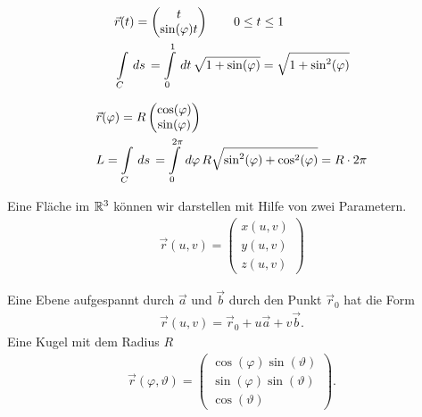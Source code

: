 \begin{Beispiel}
\begin{align*}
&\vec{r}(t) = \begin{pmatrix}t\\ \sin(\varphi) t\end{pmatrix}\qquad 0\le
t\le1\\ &\int \limits_{C} \,ds\, = \int \limits_{0}^{1} \,dt\, \sqrt{1+\sin(\varphi)} =
\sqrt{1+\sin^2(\varphi)}
\end{align*}
\end{Beispiel}
\begin{Beispiel}
\begin{align*}
 &\vec{r}(\varphi) =
R\begin{pmatrix}\cos(\varphi)\\ \sin(\varphi) \end{pmatrix}\\
 &L = \int \limits_{C} \,ds\, = \int \limits_{0}^{2\pi} \,d\varphi\,
 R\sqrt{\sin^2(\varphi) + \cos^2(\varphi)} = R\cdot2\pi
 \end{align*}
\end{Beispiel}

Eine Fläche im $\mathbb{R}^3$ können wir darstellen mit Hilfe von zwei Parametern.
\begin{align*}
\vec{r}(u,v) = \begin{pmatrix}x(u,v)\\y(u,v)\\z(u,v)\end{pmatrix}
\end{align*}

\begin{Beispiel}
Eine Ebene aufgespannt durch $\vec{a}$ und $\vec{b}$ durch den Punkt $\vec{r}_0$
hat die Form
\begin{align*}
\vec{r}(u,v) = \vec{r}_0 + u\vec{a} + v\vec{b}.
\end{align*}
Eine Kugel mit dem Radius $R$
\begin{align*}
\vec{r}(\varphi, \vartheta) =
\begin{pmatrix}\cos(\varphi)\sin(\vartheta)\\\sin(\varphi)\sin(\vartheta)\\\cos(\vartheta)\end{pmatrix}.
\end{align*}
\end{Beispiel}

